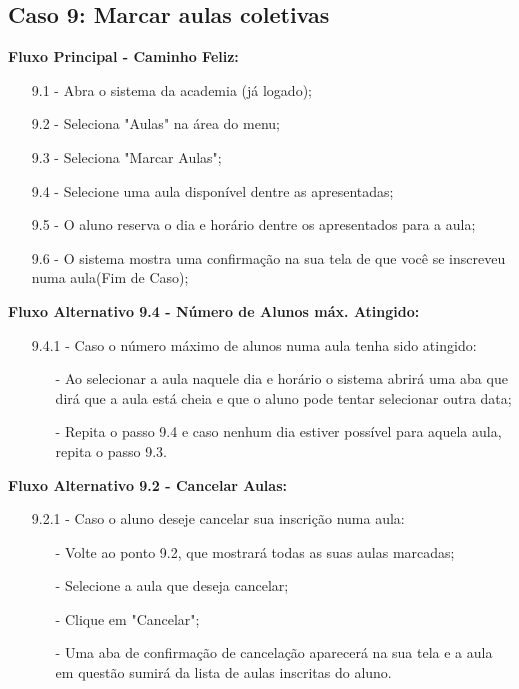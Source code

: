 \documentclass{article}
\begin{document}
\subsection{Caso 9: Marcar aulas coletivas}

    \textbf{Fluxo Principal - Caminho Feliz:}

    \begin{itemize}
        \item[9.1 -] Abra o sistema da academia (já logado);
        \item[9.2 -] Seleciona "Aulas" na área do menu;
        \item[9.3 -] Seleciona "Marcar Aulas";
        \item[9.4 -] Selecione uma aula disponível dentre as apresentadas;
        \item[9.5 -] O aluno reserva o dia e horário dentre os apresentados para a aula;
        \item[9.6 -] O sistema mostra uma confirmação na sua tela de que você se inscreveu numa aula(Fim de Caso);
    \end{itemize}
    \newpage
    \textbf{Fluxo Alternativo 9.4 - Número de Alunos máx. Atingido:}

    \begin{itemize}
        \item[9.4.1 -] Caso o número máximo de alunos numa aula tenha sido atingido:
        \begin{itemize}
            \item[-] Ao selecionar a aula naquele dia e horário o sistema abrirá uma aba que dirá que a aula está cheia e que o aluno pode tentar selecionar outra data;
            \item[-] Repita o passo 9.4 e caso nenhum dia estiver possível para aquela aula, repita o passo 9.3.
        \end{itemize}
    \end{itemize}

    \textbf{Fluxo Alternativo 9.2 - Cancelar Aulas:}

    \begin{itemize}
        \item[9.2.1 -] Caso o aluno deseje cancelar sua inscrição numa aula:
        \begin{itemize}
            \item[-] Volte ao ponto 9.2, que mostrará todas as suas aulas marcadas;
            \item[-] Selecione a aula que deseja cancelar;
            \item[-] Clique em "Cancelar";
            \item[-] Uma aba de confirmação de cancelação aparecerá na sua tela e a aula em questão sumirá da lista de aulas inscritas do aluno.
        \end{itemize}
    \end{itemize}
\end{document}
